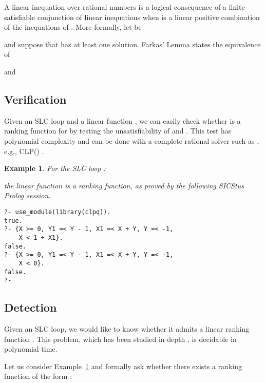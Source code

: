 \documentclass{acm_proc_article-sp}
\newtheorem{example}[theorem]{Example}
\begin{document}
A linear inequation  over rational numbers is a logical consequence
of a finite satisfiable conjunction  of linear inequations when
 is a linear positive combination of the inequations of .
More formally, let  be

and suppose that  has at least one solution.
Farkas' Lemma states the equivalence of

and



\subsection{Verification}
\label{sec:lrf-verification}

Given an SLC loop  and a linear function ,
we can easily check whether  is a ranking function for 
by testing the unsatisfiability of
 and
.
This test has polynomial complexity and can be done with a complete
rational solver such as , e.g., CLP() \cite{Holzbaur95}.

\begin{example}
\label{ex:linear-ranking-function}
For the SLC loop :

the linear function  is a ranking function, as proved by
the following \emph{SICStus Prolog} session.
\begin{verbatim}
?- use_module(library(clpq)).
true.
?- {X >= 0, Y1 =< Y - 1, X1 =< X + Y, Y =< -1,
    X < 1 + X1}.
false.
?- {X >= 0, Y1 =< Y - 1, X1 =< X + Y, Y =< -1,
    X < 0}.
false.
?-
\end{verbatim}
\end{example}

\subsection{Detection}
\label{sec:lrf-detection}

Given an SLC loop, we would like to know whether it admits a linear ranking
function .
This problem, which has been studied in depth
\cite{BagnaraMPZ12IC,PodelskiR04,SohnVG91},
is decidable in polynomial time.

Let us consider Example~\ref{ex:linear-ranking-function}
and formally ask whether there exists a ranking function of the form
:
\end{document}
